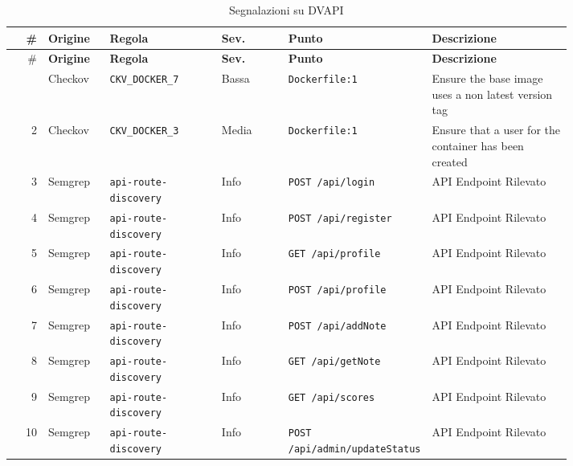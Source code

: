 \begingroup\linespread{1.0}\footnotesize\selectfont\setlength{\tabcolsep}{4pt}
\begin{longtable}{@{}r >{\raggedright\arraybackslash}p{0.11\linewidth} >{\raggedright\arraybackslash}p{0.2\linewidth} l >{\raggedright\arraybackslash}p{0.25\linewidth} >{\raggedright\arraybackslash}p{0.25\linewidth}@{}}
\caption{Segnalazioni su DVAPI}\label{tab:app-dvapi}\\
\toprule
\# & \textbf{Origine} & \textbf{Regola} & \textbf{Sev.} & \textbf{Punto} & \textbf{Descrizione}\\
\midrule\endfirsthead
\toprule
\# & \textbf{Origine} & \textbf{Regola} & \textbf{Sev.} & \textbf{Punto} & \textbf{Descrizione}\\
\midrule\endhead
\bottomrule\endfoot
1 & Checkov & \texttt{CKV\_\allowbreak{}DOCKER\_\allowbreak{}7} & Bassa & \texttt{Dockerfile:1} & Ensure the base image uses a non latest version tag\\
2 & Checkov & \texttt{CKV\_\allowbreak{}DOCKER\_\allowbreak{}3} & Media & \texttt{Dockerfile:1} & Ensure that a user for the container has been created\\
3 & Semgrep & \texttt{api-\allowbreak{}route-\allowbreak{}discovery} & Info & \texttt{POST /\allowbreak{}api/\allowbreak{}login} & API Endpoint Rilevato\\
4 & Semgrep & \texttt{api-\allowbreak{}route-\allowbreak{}discovery} & Info & \texttt{POST /\allowbreak{}api/\allowbreak{}register} & API Endpoint Rilevato\\
5 & Semgrep & \texttt{api-\allowbreak{}route-\allowbreak{}discovery} & Info & \texttt{GET /\allowbreak{}api/\allowbreak{}profile} & API Endpoint Rilevato\\
6 & Semgrep & \texttt{api-\allowbreak{}route-\allowbreak{}discovery} & Info & \texttt{POST /\allowbreak{}api/\allowbreak{}profile} & API Endpoint Rilevato\\
7 & Semgrep & \texttt{api-\allowbreak{}route-\allowbreak{}discovery} & Info & \texttt{POST /\allowbreak{}api/\allowbreak{}addNote} & API Endpoint Rilevato\\
8 & Semgrep & \texttt{api-\allowbreak{}route-\allowbreak{}discovery} & Info & \texttt{GET /\allowbreak{}api/\allowbreak{}getNote} & API Endpoint Rilevato\\
9 & Semgrep & \texttt{api-\allowbreak{}route-\allowbreak{}discovery} & Info & \texttt{GET /\allowbreak{}api/\allowbreak{}scores} & API Endpoint Rilevato\\
10 & Semgrep & \texttt{api-\allowbreak{}route-\allowbreak{}discovery} & Info & \texttt{POST /\allowbreak{}api/\allowbreak{}admin/\allowbreak{}updateStatus} & API Endpoint Rilevato\\

\end{longtable}
